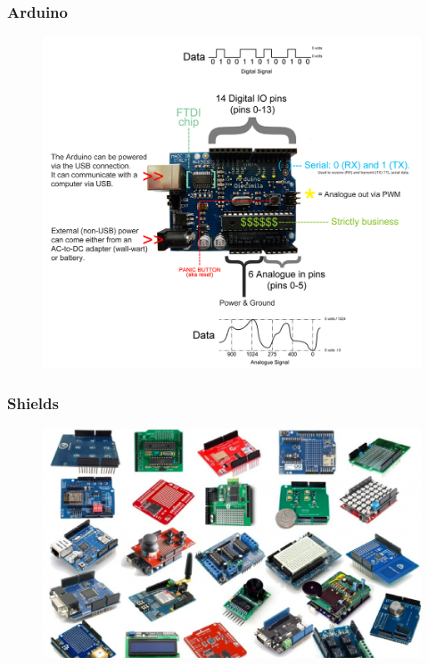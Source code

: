 \begin{frame}
	\frametitle{Arduino}
	
	 \begin{figure}
		\includegraphics[scale=.2]{assets/map} 
	\end{figure}
\end{frame}



\begin{frame}
	\frametitle{Shields}
	\begin{figure}
		\includegraphics[scale=.28]{assets/shields} 
	\end{figure}
\end{frame}

